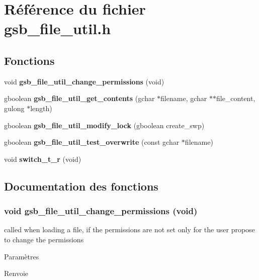 \section{Référence du fichier gsb\_\-file\_\-util.h}
\label{gsb__file__util_8h}
\subsection*{Fonctions}
\begin{DoxyCompactItemize}
\item 
void {\bf gsb\_\-file\_\-util\_\-change\_\-permissions} (void)
\item 
gboolean {\bf gsb\_\-file\_\-util\_\-get\_\-contents} (gchar $\ast$filename, gchar $\ast$$\ast$file\_\-content, gulong $\ast$length)
\item 
gboolean {\bf gsb\_\-file\_\-util\_\-modify\_\-lock} (gboolean create\_\-swp)
\item 
gboolean {\bf gsb\_\-file\_\-util\_\-test\_\-overwrite} (const gchar $\ast$filename)
\item 
void {\bf switch\_\-t\_\-r} (void)
\end{DoxyCompactItemize}


\subsection{Documentation des fonctions}
\subsubsection[{gsb\_\-file\_\-util\_\-change\_\-permissions}]{\setlength{\rightskip}{0pt plus 5cm}void gsb\_\-file\_\-util\_\-change\_\-permissions (void)}\label{gsb__file__util_8h_a5860b25ee5eef286dbb07e812c66c0fd}
called when loading a file, if the permissions are not set only for the user propose to change the permissions


\begin{DoxyParams}{Paramètres}
\item[{\em }]\end{DoxyParams}
\begin{DoxyReturn}{Renvoie}

\end{DoxyReturn}


